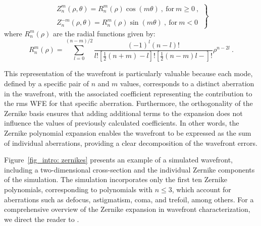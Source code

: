 \begin{equation}
  \left.
  \begin{array}{l}
  Z _ n ^m (\rho, \theta) = R _ n ^m (\rho) \cos (m\theta)\ , \ \text{for} \ m \geqslant 0 \ ,\\
  \\
  Z _ n ^{-m} (\rho, \theta) = R _ n ^m (\rho) \sin (m\theta) \ , \ \text{for}  \ m < 0 \ 
  \end{array}
  \right\}
\end{equation}
where $R _ n ^m (\rho)$ are the radial functions given by:
\begin{equation}
  R_n^m(\rho)=\sum_{l=0}^{(n-m) / 2} \frac{(-1)^l(n-l)!}{l!\left[\frac{1}{2}(n+m)-l\right]!\left[\frac{1}{2}(n-m)l-\right]!}\rho ^{n - 2l} \ .
\end{equation}

This representation of the wavefront is particularly valuable because each mode, defined by a specific pair of $n$ and $m$ values, corresponds to a distinct aberration in the wavefront, with the associated coefficient representing the contribution to the rms WFE for that specific aberration. Furthermore, the orthogonality of the Zernike basis ensures that adding additional terms to the expansion does not influence the values of previously calculated coefficients. In other words, the Zernike polynomial expansion enables the wavefront to be expressed as the sum of individual aberrations, providing a clear decomposition of the wavefront errors.

Figure~\ref{fig_intro: zernikes} presents an example of a simulated wavefront, including a two-dimensional cross-section and the individual Zernike components of the simulation. The simulation incorporates only the first ten Zernike polynomials, corresponding to polynomials with $n \leqslant 3$, which account for aberrations such as defocus, astigmatism, coma, and trefoil, among others. For a comprehensive overview of the Zernike expansion in wavefront characterization, we direct the reader to \citet{Zernike_guide}.

